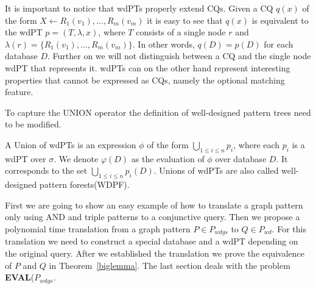It is important to notice that wdPTs properly extend CQs.
Given a CQ $q(x)$ of the form $X \leftarrow R_1(v_1),\dots,R_m(v_m)$
it is easy to see that $q(x)$ is equivalent to the wdPT $p = (T,\lambda,x)$,
where $T$ consists of a single node $r$ and $\lambda(r) =
\{R_1(v_1),\dots,R_m(v_m)\}$. In other words, $q(D) = p(D)$ for each database
$D$. Further on we will not distinguish between a CQ and the single node wdPT
that represents it. wdPTs can on the other hand represent interesting properties
that cannot be expressed as CQs, namely the optional matching feature. 

%

To capture the UNION operator the definition of well-designed pattern trees
need to be modified.  
\begin{definition}
	A Union of wdPTs is an expression $\phi$ of the form $\bigcup_{1\leq i \leq n} p_i$, 
	where each $p_i$ is a wdPT over $\sigma$.
	We denote $\varphi(D)$ as the evaluation of $\phi$ over database $D$.
	It corresponds to the set $\bigcup_{1\leq i \leq n}p_i(D)$.
	Unions of wdPTs are also called well-designed pattern
	forests(WDPF).
\end{definition}



First we are going to show an easy example of how to translate a graph pattern
only using AND and triple patterns to a conjunctive query. Then we propose a
polynomial time translation from a graph pattern $P \in P_{wdgs}$ to $Q \in P_{wd}$. For this
translation we need to construct a special database and a wdPT depending on the
original query. After we established the translation we prove the equivalence of $P$ and $Q$ in
Theorem~\ref{biglemma}. The last section deals with the problem
\textbf{EVAL}($P_{wdgs}$.


